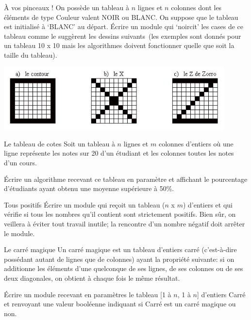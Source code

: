 \begin{Exercice}{À vos pinceaux !}
	On possède un tableau à $n$ lignes et $n$ colonnes dont les éléments de type
	Couleur valent NOIR ou BLANC. On suppose que le tableau est initialisé
	à ‘BLANC’ au départ. Écrire un module qui ‘noircit’ les cases de ce
	tableau comme le suggèrent les dessins suivants~(les exemples sont
	donnés pour un tableau 10 x 10 mais les algorithmes doivent fonctionner
	quelle que soit la taille du tableau).
	
	\begin{center}
	\includegraphics[width=0.9\textwidth]{image/tab2d-ex-oxz}
	\end{center}
\end{Exercice}

\begin{Exercice}{Le tableau de cotes}
	Soit un tableau à $n$ lignes et $m$ colonnes d'entiers où
	une ligne représente les notes sur 20 d'un étudiant et
	les colonnes toutes les notes d'un cours.
	
	Écrire un algorithme recevant ce tableau en paramètre et affichant le
	pourcentage d'étudiants ayant obtenu une moyenne
	supérieure à 50\%.
\end{Exercice}

\begin{Exercice}{Tous positifs}
	Écrire un module qui reçoit un tableau ($n$ x $m$) d’entiers et qui vérifie
	si tous les nombres qu’il contient sont strictement positifs. Bien sûr,
	on veillera à éviter tout travail inutile; la rencontre d’un nombre
	négatif doit arrêter le module.
\end{Exercice}

\begin{Exercice}{Le carré magique}
	Un carré magique est un tableau d’entiers carré
	(c'est-à-dire possédant autant de lignes que de
	colonnes) ayant la propriété suivante: si on additionne les éléments
	d'une quelconque de ses lignes, de ses colonnes ou de
	ses deux diagonales, on obtient à chaque fois le même résultat.

	Écrire un module recevant en paramètres le tableau [1 à $n$, 1 à $n$]
	d'entiers Carré et renvoyant une valeur booléenne
	indiquant si Carré est un carré magique ou non.
\end{Exercice}

